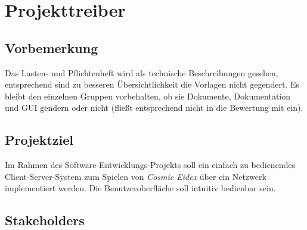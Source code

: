 \chapter{Projekttreiber}

\section{Vorbemerkung}

Das Lasten- und Pflichtenheft wird als technische Beschreibungen gesehen, entsprechend sind zu besseren Übersichtlichkeit die Vorlagen nicht gegendert. Es bleibt den einzelnen Gruppen vorbehalten, ob sie Dokumente, Dokumentation und GUI gendern oder nicht (fließt entsprechend nicht in die Bewertung mit ein).

\section{Projektziel}

Im Rahmen des Software-Entwicklungs-Projekts {\the\year} soll ein einfach zu bedienendes Client-Server-System zum Spielen von \textit{Cosmic Eidex} über ein Netzwerk implementiert werden. Die Benutzeroberfläche soll intuitiv bedienbar sein.

\section{Stakeholders}

\setcounter{sh}{10}

